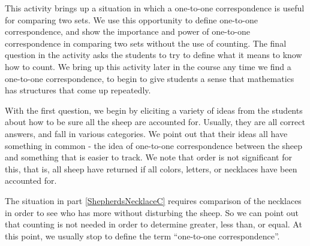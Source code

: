 \documentclass{ximera}
\begin{document}
\newpage
\begin{instructorNotes}

This activity brings up a situation in which a one-to-one correspondence is useful for comparing two sets.  We use this opportunity to define one-to-one correspondence, and show the importance and power of one-to-one correspondence in comparing two sets without the use of counting.  
The final question in the activity asks the students to try to define what it means to know how to count. We bring up this activity later in the course any time we find a one-to-one correspondence, to begin to give students a sense that mathematics has structures that come up repeatedly.


With the first question, we begin by eliciting a variety of ideas from the students about how to be sure all the sheep are accounted for.  Usually, they are all correct answers, and fall in various categories.  We point out that their ideas all have something in common - the idea of one-to-one correspondence between the sheep and something that is easier to track.  We note that order is not significant for this, that is, all sheep have returned if all colors, letters, or necklaces have been accounted for.


The situation in part \ref{ShepherdsNecklaceC} requires comparison of the necklaces in order to see who has more without disturbing the sheep.  So we can point out that counting is not needed in order to determine greater, less than, or equal. At this point, we usually stop to define the term ``one-to-one correspondence''.




\end{instructorNotes}
\end{document}
